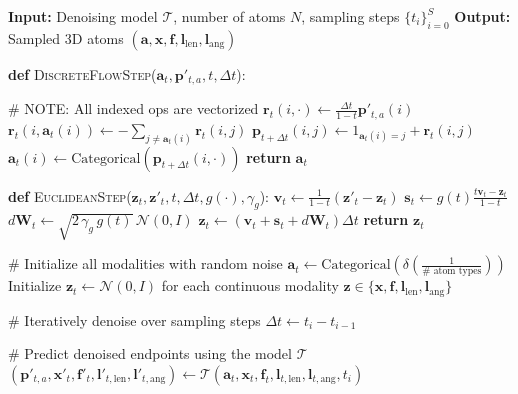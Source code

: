\documentclass{article}
\theoremstyle{plain}
\theoremstyle{definition}
\theoremstyle{remark}
\begin{document}
\begin{algorithm}[tb]
\scriptsize
\caption{Pseudocode for multimodal sampling}
\label{algorithm:multimodal_sampling}
\begin{algorithmic}[1]
  \STATE \textbf{Input:} Denoising model $\mathcal{T}$, number of atoms $N$, sampling steps $\{t_i\}_{i=0}^S$
  \STATE \textbf{Output:} Sampled 3D atoms $(\mathbf{a}, \mathbf{x}, \mathbf{f}, \mathbf{l}_\text{len}, \mathbf{l}_\text{ang})$
  \vspace{0.1in}

  \STATE \textbf{def} \textsc{DiscreteFlowStep}($\mathbf{a}_t, \mathbf{p}'_{t, a}, t, \Delta t$):
    \item[] \quad \textcolor{commentcolor}{\# NOTE: All indexed ops are vectorized}
    \STATE \quad $\mathbf{r}_t(i, \cdot) \gets \frac{\Delta t}{1-t} \mathbf{p}'_{t, a}(i)$ \citep{campbell24dfm}
    \STATE \quad $\mathbf{r}_t(i, \mathbf{a}_t(i)) \gets -\sum_{j \neq \mathbf{a}_t(i)} \mathbf{r}_t(i, j)$
    \STATE \quad $\mathbf{p}_{t+\Delta t}(i, j) \gets 1_{\mathbf{a}_t(i)=j} + \mathbf{r}_t(i,j)$
    \STATE \quad $\mathbf{a}_t(i) \gets \text{Categorical}(\mathbf{p}_{t+\Delta t}(i, \cdot))$
    \STATE \quad \textbf{return} $\mathbf{a}_t$
  \vspace{0.1in}

  \STATE \textbf{def} \textsc{EuclideanStep}($\mathbf{z}_t, \mathbf{z}'_t, t, \Delta t, g(\cdot), \gamma_g$):
    \STATE \quad $\mathbf{v}_t \gets \frac{1}{1-t}(\mathbf{z}'_t - \mathbf{z}_t)$ \citep{geffner2025proteina}
    \STATE \quad $\mathbf{s}_t \gets g(t)\frac{t \mathbf{v}_t - \mathbf{z}_t}{1-t}$
    \STATE \quad $d\mathbf{W}_t \gets \sqrt{2\,\gamma_g\,g(t)}\,\mathcal{N}(0, I)$
    \STATE \quad $\mathbf{z}_t \gets (\mathbf{v}_t + \mathbf{s}_t + d\mathbf{W}_t)\Delta t$
    \STATE \quad \textbf{return} $\mathbf{z}_t$
  \vspace{0.1in}

  \item[] \textcolor{commentcolor}{\# Initialize all modalities with random noise}
  \STATE $\mathbf{a}_t \gets \text{Categorical}(\delta(\frac{1}{\# \text{ atom types}}))$
  \STATE Initialize $\mathbf{z}_t \gets \mathcal{N}(0, I)$ for each continuous modality $\mathbf{z} \in \{\mathbf{x}, \mathbf{f}, \mathbf{l}_\text{len}, \mathbf{l}_\text{ang}\}$
  
  \item[] \textcolor{commentcolor}{\# Iteratively denoise over sampling steps}
    \STATE \quad $\Delta t \gets t_i - t_{i-1}$
    \item[] \quad \textcolor{commentcolor}{\# Predict denoised endpoints using the model $\mathcal{T}$}
    \STATE \quad $(\mathbf{p}'_{t, a}, \mathbf{x}'_t, \mathbf{f}'_t, \mathbf{l}'_{t, \text{len}}, \mathbf{l}'_{t, \text{ang}}) \gets \mathcal{T}(\mathbf{a}_t, \mathbf{x}_t, \mathbf{f}_t, \mathbf{l}_{t, \text{len}}, \mathbf{l}_{t, \text{ang}}, t_i)$
    

\end{algorithmic}
\end{algorithm}
\end{document}
